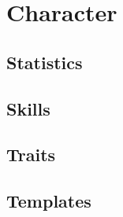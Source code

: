 
\chapter{Character}

\section{Statistics}


\section{Skills}


\section{Traits}


\section{Templates}

